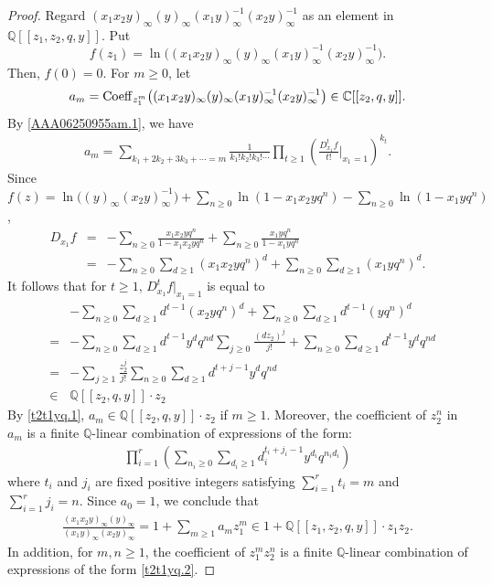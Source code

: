 \documentclass[12pt, reqno]{amsart}
\theoremstyle{definition}
\theoremstyle{remark}
\numberwithin{equation}{section}
\newcommand{\C}{ \mathbb C }
\newcommand{\Coe}{ {\rm Coeff} }
\newcommand{\Q}{ \mathbb Q }
\numberwithin{equation}{section}
\begin{document}
\begin{proof}
Regard $(x_1x_2y)_\infty (y)_\infty (x_1y)_\infty^{-1} (x_2y)_\infty^{-1}$ 
as an element in $\Q[[z_1,z_2,q,y]]$. Put
$$
f(z_1) = \ln\big ((x_1x_2y)_\infty (y)_\infty (x_1y)_\infty^{-1} 
(x_2y)_\infty^{-1} \big ).
$$
Then, $f(0) = 0$. For $m \ge 0$, let 
$$
a_{m} = \Coe_{z_1^m} 
\big ((x_1x_2y)_\infty (y)_\infty (x_1y)_\infty^{-1} (x_2y)_\infty^{-1} 
\big ) \in \C[[z_2,q,y]].
$$
By \eqref{AAA06250955am.1}, we have
\begin{eqnarray}  \label{t2t1yq.1}
  a_{m}
= \sum_{k_1+2k_2+3k_3+\cdots = m}
  \frac{1}{k_1! k_2! k_3! \cdots} \prod_{t \ge 1}
  \left (\frac{D_{x_1}^t f}{t!} \Big |_{x_1=1}\right )^{k_t}. 
\end{eqnarray} 
Since $f(z) = \ln\big ((y)_\infty (x_2y)_\infty^{-1} \big ) 
+ \sum_{n \ge 0} \ln (1-x_1x_2yq^n) - \sum_{n \ge 0} \ln (1-x_1yq^n)$,
\begin{eqnarray*} 
   D_{x_1}f  
&=&-\sum_{n \ge 0} \frac{x_1x_2yq^n}{1-x_1x_2yq^n} 
+ \sum_{n \ge 0} \frac{x_1yq^n}{1-x_1yq^n} \\
&=&-\sum_{n \ge 0} \sum_{d \ge 1} (x_1x_2yq^n)^d 
   + \sum_{n \ge 0} \sum_{d \ge 1} (x_1yq^n)^d.
\end{eqnarray*} 
It follows that for $t \ge 1$, $D_{x_1}^tf|_{x_1=1}$ is equal to
\begin{eqnarray*} 
& &-\sum_{n \ge 0} \sum_{d \ge 1} d^{t-1} (x_2yq^n)^d 
   + \sum_{n \ge 0} \sum_{d \ge 1} d^{t-1} (yq^n)^{d} \\
&=&-\sum_{n \ge 0} \sum_{d \ge 1} d^{t-1}y^dq^{nd} \sum_{j \ge 0} 
   \frac{(dz_2)^j}{j!} 
   + \sum_{n \ge 0} \sum_{d \ge 1} d^{t-1} y^dq^{nd}  \\
&=&-\sum_{j \ge 1} \frac{z_2^j}{j!}
   \sum_{n \ge 0} \sum_{d \ge 1} d^{t+j-1} y^dq^{nd} \\
&\in&\Q[[z_2, q,y]] \cdot z_2
\end{eqnarray*} 
By \eqref{t2t1yq.1}, $a_{m} \in \Q[[z_2, q,y]] \cdot z_2$ if $m \ge 1$. 
Moreover, the coefficient of $z_2^n$ in $a_m$ is 
a finite $\Q$-linear combination of expressions of the form:
\begin{eqnarray}  \label{t2t1yq.2}
\prod_{i=1}^r \left (\sum_{n_i \ge 0} \sum_{d_i \ge 1} 
d_i^{t_i+j_i-1} y^{d_i}q^{n_i d_i} \right )
\end{eqnarray}
where $t_i$ and $j_i$ are fixed positive integers satisfying 
$\sum_{i=1}^r t_i = m$ and $\sum_{i=1}^r j_i = n$.
Since $a_0 = 1$, we conclude that 
\begin{eqnarray}  \label{t2t1yq.3}
  \frac{(x_1x_2y)_\infty (y)_\infty}{(x_1y)_\infty (x_2y)_\infty}
= 1 + \sum_{m \ge 1} a_m z_1^m
\in 1 + \Q[[z_1, z_2, q, y]] \cdot z_1z_2. 
\end{eqnarray}
In addition, for $m,n \ge 1$, the coefficient of $z_1^m z_2^n$ is 
a finite $\Q$-linear combination of expressions of 
the form \eqref{t2t1yq.2}.


\end{proof}
\end{document}
